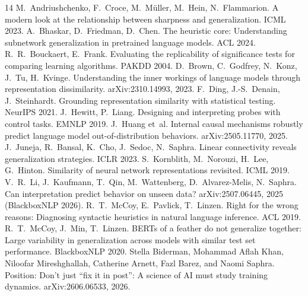 \documentclass[10pt]{article}
\begin{document}

\begin{thebibliography}{14}\small\itemsep0pt
 M.~Andriushchenko, F.~Croce, M.~M\"uller, M.~Hein, N.~Flammarion. A modern look at the relationship between sharpness and generalization. ICML 2023.
 A.~Bhaskar, D.~Friedman, D.~Chen. The heuristic core: Understanding subnetwork generalization in pretrained language models. ACL 2024.
 R.~R.~Bouckaert, E.~Frank. Evaluating the replicability of significance tests for comparing learning algorithms. PAKDD 2004.
 D.~Brown, C.~Godfrey, N.~Konz, J.~Tu, H.~Kvinge. Understanding the inner workings of language models through representation dissimilarity. arXiv:2310.14993, 2023.
 F.~Ding, J.-S.~Denain, J.~Steinhardt. Grounding representation similarity with statistical testing. NeurIPS 2021.
 J.~Hewitt, P.~Liang. Designing and interpreting probes with control tasks. EMNLP 2019.
 J.~Huang et~al. Internal causal mechanisms robustly predict language model out-of-distribution behaviors. arXiv:2505.11770, 2025.
 J.~Juneja, R.~Bansal, K.~Cho, J.~Sedoc, N.~Saphra. Linear connectivity reveals generalization strategies. ICLR 2023.
 S.~Kornblith, M.~Norouzi, H.~Lee, G.~Hinton. Similarity of neural network representations revisited. ICML 2019.
 V.~R.~Li, J.~Kaufmann, T.~Qin, M.~Wattenberg, D.~Alvarez-Melis, N.~Saphra. Can interpretation predict behavior on unseen data? arXiv:2507.06445, 2025 (BlackboxNLP 2026).
 R.~T.~McCoy, E.~Pavlick, T.~Linzen. Right for the wrong reasons: Diagnosing syntactic heuristics in natural language inference. ACL 2019.
 R.~T.~McCoy, J.~Min, T.~Linzen. BERTs of a feather do not generalize together: Large variability in generalization across models with similar test set performance. BlackboxNLP 2020.
 Stella Biderman, Mohammad Aflah Khan, Niloofar Mireshghallah, Catherine Arnett, Fazl Barez, and Naomi Saphra. Position: Don't just ``fix it in post'': A science of AI must study training dynamics. arXiv:2606.06533, 2026.
\end{thebibliography}
\end{document}

